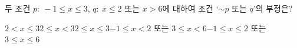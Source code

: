 두 조건 $p:\ -1\le x\le 3$, $q:\ x\le 2$ 또는 $x>6$에 대하여 조건 ‘${\sim} p$ 또는 $q$’의 부정은?
\begin{choicesv}{$2<x\le 3$}{$2\le x<3$}{$2\le x\le 3$}{$-1\le x<2$ 또는 $3\le x<6$}{$-1\le x\le 2$ 또는 $3\le x\le 6$}\end{choicesv}
